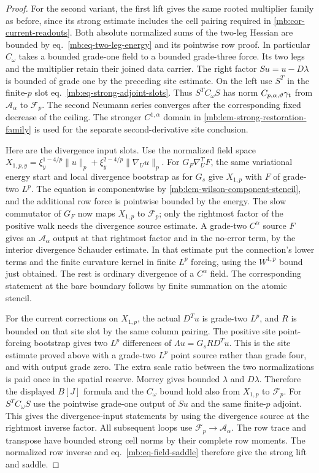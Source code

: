 \documentclass[11pt,letterpaper,reqno]{amsart}
\numberwithin{equation}{section}
\renewcommand{\eqref}[1]{\textup{eq.~\ref{#1}}}
\theoremstyle{definition}
\theoremstyle{remark}
\begin{document}
\begin{proof}
For the second variant, the first lift gives the same rooted multiplier family as before, since its strong estimate includes the cell pairing required in \cref{mb:cor-current-readouts}. Both absolute normalized sums of the two-leg Hessian are bounded by \eqref{mb:eq-two-leg-energy} and its pointwise row proof. In particular \(C_\omega\) takes a bounded grade-one field to a bounded grade-three force. Its two legs and the multiplier retain their joined data carrier. The right factor \(Su=u-D\lambda\) is bounded of grade one by the preceding site estimate. On the left use \(S^T\) in the finite-\(p\) slot \eqref{mb:eq-strong-adjoint-slots}. Thus \(S^TC_\omega S\) has norm \(C_{p,\alpha,\vartheta}\gamma_{\rm t}\) from \(\mathcal A_\alpha\) to \(\mathcal F_p\). The second Neumann series converges after the corresponding fixed decrease of the ceiling. The stronger \(C^{1,\alpha}\) domain in \cref{mb:lem-strong-restoration-family} is used for the separate second-derivative site conclusion.

Here are the divergence input slots. Use the normalized field space \(X_{1,p,y}=\xi_y^{1-4/p}\|u\|_p+\xi_y^{2-4/p}\|\nabla_Uu\|_p\). For \(G_F\nabla_U^TF\), the same variational energy start and local divergence bootstrap as for \(G_s\) give \(X_{1,p}\) with \(F\) of grade-two \(L^p\). The equation is componentwise by \cref{mb:lem-wilson-component-stencil}, and the additional row force is pointwise bounded by the energy. The slow commutator of \(G_F\) now maps \(X_{1,p}\) to \(\mathcal F_p\); only the rightmost factor of the positive walk needs the divergence source estimate. A grade-two \(C^\alpha\) source \(F\) gives an \(\mathcal A_\alpha\) output at that rightmost factor and in the no-error term, by the interior divergence Schauder estimate. In that estimate put the connection's lower terms and the finite curvature kernel in finite \(L^p\) forcing, using the \(W^{1,p}\) bound just obtained. The rest is ordinary divergence of a \(C^\alpha\) field. The corresponding statement at the bare boundary follows by finite summation on the atomic stencil.

For the current corrections on \(X_{1,p}\), the actual \(D^T u\) is grade-two \(L^p\), and \(R\) is bounded on that site slot by the same column pairing. The positive site point-forcing bootstrap gives two \(L^p\) differences of \(\Lambda u=G_sRD^T u\). This is the site estimate proved above with a grade-two \(L^p\) point source rather than grade four, and with output grade zero. The extra scale ratio between the two normalizations is paid once in the spatial reserve. Morrey gives bounded \(\lambda\) and \(D\lambda\). Therefore the displayed \(B[J]\) formula and the \(C_\omega\) bound hold also from \(X_{1,p}\) to \(\mathcal F_p\). For \(S^T C_\omega S\) use the pointwise grade-one output of \(Su\) and the same finite-\(p\) adjoint. This gives the divergence-input statements by using the divergence source at the rightmost inverse factor. All subsequent loops use \(\mathcal F_p\to\mathcal A_\alpha\). The row trace and transpose have bounded strong cell norms by their complete row moments. The normalized row inverse and \eqref{mb:eq-field-saddle} therefore give the strong lift and saddle.


\end{proof}
\end{document}

